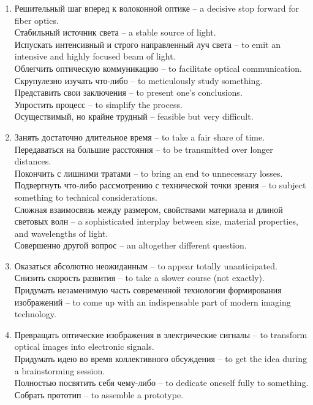 \documentclass[a4paper, 12pt]{article}
\begin{document}
\begin{enumerate}[label=\alph*)]
	\item
		   Решительный шаг вперед к волоконной оптике -- a decisive stop forward for fiber optics.
		\\ Стабильный источник света -- a stable source of light.
		\\ Испускать интенсивный и строго направленный луч света -- to emit an intensive and highly focused beam of light.
		\\ Облегчить оптическую коммуникацию -- to facilitate optical communication.
		\\ Скрупулезно изучать что-либо -- to meticulously study something.
		\\ Представить свои заключения -- to present one's conclusions.
		\\ Упростить процесс -- to simplify the process.
		\\ Осуществимый, но крайне трудный -- feasible but very difficult.

	\item
		   Занять достаточно длительное время -- to take a fair share of time.
		\\ Передаваться на большие расстояния -- to be transmitted over longer distances.
		\\ Покончить с лишними тратами -- to bring an end to unnecessary losses.
		\\ Подвергнуть что-либо рассмотрению с технической точки зрения -- to subject something to technical considerations.
		\\ Сложная взаимосвязь между размером, свойствами материала и длиной световых волн -- a sophisticated interplay between size, material properties, and wavelengths of light.
		\\ Совершенно другой вопрос -- an altogether different question.

	\item
		   Оказаться абсолютно неожиданным -- to appear totally unanticipated.
		\\ Снизить скорость развития -- to take a slower course (not exactly).
		\\ Придумать незаменимую часть современной технологии формирования изображений -- to come up with an indispensable part of modern imaging technology.
		
	\item
		   Превращать оптические изображения в электрические сигналы -- to transform optical images into electronic signals.
		\\ Придумать идею во время коллективного обсуждения -- to get the idea during a brainstorming session.
		\\ Полностью посвятить себя чему-либо -- to dedicate oneself fully to something.
		\\ Собрать прототип -- to assemble a prototype.


\end{enumerate}
\end{document}
